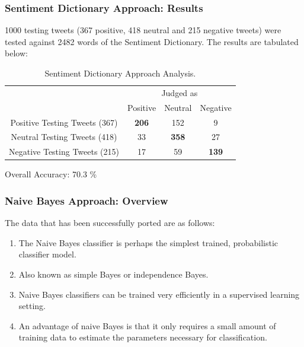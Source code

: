 \documentclass[12pt,xcolor=dvipsnames,table,titlepage]{beamer}
\begin{document}
\begin{frame}[t]
\frametitle{Sentiment Dictionary Approach: Results}
1000 testing tweets (367 positive, 418 neutral and 215 negative tweets) were tested against 2482 words of the Sentiment Dictionary. The results are tabulated below:\\
\begin{table}[h]
\begin{tabular}{c|c|c|c|}
\cline{2-4}
                                                  & \multicolumn{3}{c|}{Judged as}                                                                                   \\ \cline{2-4} 
\multirow{-2}{*}{}                                & Positive                           & Neutral                              & Negative                             \\ \hline
\multicolumn{1}{|c|}{Positive Testing Tweets (367)} & {\color[HTML]{036400} \textbf{206}} & {\color[HTML]{680100} 152}            & {\color[HTML]{680100} 9}            \\ \hline
\multicolumn{1}{|c|}{Neutral Testing Tweets (418)}  & {\color[HTML]{680100} 33}        & {\color[HTML]{036400} \textbf{358}} & {\color[HTML]{680100} 27}          \\ \hline
\multicolumn{1}{|c|}{Negative Testing Tweets (215)} & {\color[HTML]{680100} 17}        & {\color[HTML]{680100} 59}          & {\color[HTML]{036400} \textbf{139}} \\ \hline
\end{tabular}
\caption{Sentiment Dictionary Approach Analysis.}
Overall Accuracy: 70.3 \%
\par\smallskip
\end{table}
\end{frame}


\begin{frame}[t]
\frametitle{Naive Bayes Approach: Overview \cite{naivebayes1}}
The data that has been successfully ported are as follows:
\begin{enumerate}
 \item The Naive Bayes classifier is perhaps the simplest trained, probabilistic classifier model.
 \item Also known as simple Bayes or independence Bayes.
 \item Naive Bayes classifiers can be trained very efficiently in a supervised learning setting.
 \item An advantage of naive Bayes is that it only requires a small amount of training data to estimate the parameters necessary for classification.
\end{enumerate}
\end{frame}
\end{document}
